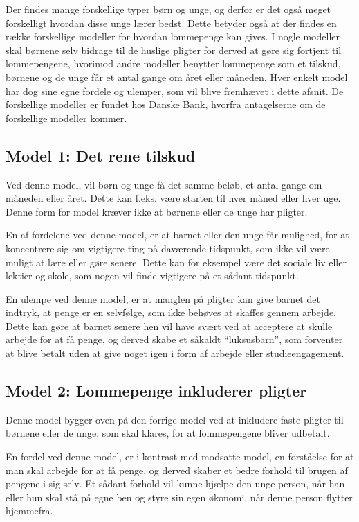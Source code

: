 Der findes mange forskellige typer børn og unge, 
og derfor er det også meget forskelligt hvordan 
disse unge lærer bedst. Dette betyder også at 
der findes en række forskellige modeller for 
hvordan lommepenge kan gives. I nogle modeller 
skal børnene selv bidrage til de huslige pligter 
for derved at gøre sig fortjent til 
lommepengene, hvorimod andre modeller benytter 
lommepenge som et tilskud, børnene og de unge 
får et antal gange om året eller måneden. Hver 
enkelt model har dog sine egne fordele og 
ulemper, som vil blive fremhævet i dette afsnit. 
De forskellige modeller er fundet hos Danske 
Bank, hvorfra antagelserne om de forskellige 
modeller kommer\cite{DanskeB2}\cite{DanskeB3}.

\subsection{Model 1: Det rene tilskud}
Ved denne model, vil børn og unge få det samme 
beløb, et antal gange om måneden eller året. 
Dette kan f.eks. være starten til hver måned 
eller hver uge. Denne form for model kræver ikke 
at børnene eller de unge har pligter.

En af fordelene ved denne model, er at barnet 
eller den unge får mulighed, for at koncentrere 
sig om vigtigere ting på daværende tidspunkt, 
som ikke vil være muligt at lære eller gøre 
senere. Dette kan for eksempel være det sociale 
liv eller lektier og skole, som nogen vil finde 
vigtigere på et sådant tidspunkt.

En ulempe ved denne model, er at manglen på 
pligter kan give barnet det indtryk, at penge er 
en selvfølge, som ikke behøves at skaffes gennem 
arbejde. Dette kan gøre at barnet senere hen 
vil have svært ved at acceptere at skulle 
arbejde for at få penge, og derved skabe et 
såkaldt “luksusbarn”, som forventer at blive 
betalt uden at give noget igen i form af 
arbejde eller studieengagement.

\subsection{Model 2: Lommepenge inkluderer 
pligter}
Denne model bygger oven på den forrige model ved 
at inkludere faste pligter til børnene eller de 
unge, som skal klares, for at lommepengene 
bliver udbetalt.

En fordel ved denne model, er i kontrast med 
modsatte model, en forståelse for at man skal 
arbejde for at få penge, og derved skaber et 
bedre forhold til brugen af pengene i sig selv. 
Et sådant forhold vil kunne hjælpe den unge 
person, når han eller hun skal stå på egne ben 
og styre sin egen økonomi, når denne person 
flytter hjemmefra.

